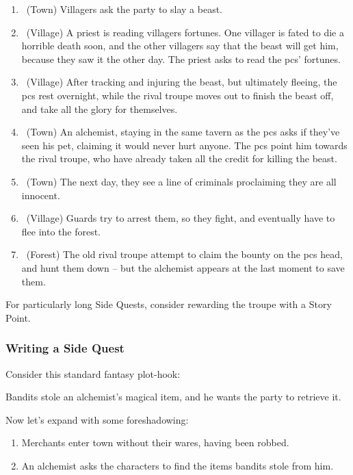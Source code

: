 \begin{multicols}{2}
\begin{enumerate}
  \item
  \sqr~(Town)
  Villagers ask the party to slay a beast.
  \item
  \sqr~(Village)
  A priest is reading villagers fortunes.
  One villager is fated to die a horrible death soon, and the other villagers say that the beast will get him, because they saw it the other day.
  The priest asks to read the \glspl{pc}' fortunes.
  \item
  \sqr~(Village)
  After tracking and injuring the beast, but ultimately fleeing, the \glspl{pc} rest overnight, while the rival troupe moves out to finish the beast off, and take all the glory for themselves.
  \item
  \sqr~(Town)
  An alchemist, staying in the same tavern as the \glspl{pc} asks if they've seen his pet, claiming it would never hurt anyone.
  The \glspl{pc} point him towards the rival troupe, who have already taken all the credit for killing the beast.
  \item
  \sqr~(Town)
  The next day, they see a line of criminals proclaiming they are all innocent.
  \item
  \sqr~(Village)
  Guards try to arrest them, so they fight, and eventually have to flee into the forest.
  \item
  \sqn~(Forest)
  The old rival troupe attempt to claim the bounty on the \glspl{pc} head, and hunt them down -- but the alchemist appears at the last moment to save them.

\end{enumerate}
\noindent

For particularly long Side Quests, consider rewarding the troupe with a Story Point.

\subsubsection{Writing a Side Quest}

Consider this standard fantasy plot-hook:

\begin{exampletext}

  Bandits stole an alchemist's magical item, and he wants the party to retrieve it.

\end{exampletext}

Now let's expand with some foreshadowing:

\begin{enumerate}
  \item
  Merchants enter town without their wares, having been robbed.
  \item
  An alchemist asks the characters to find the items bandits stole from him.
\end{enumerate}


\end{multicols}
